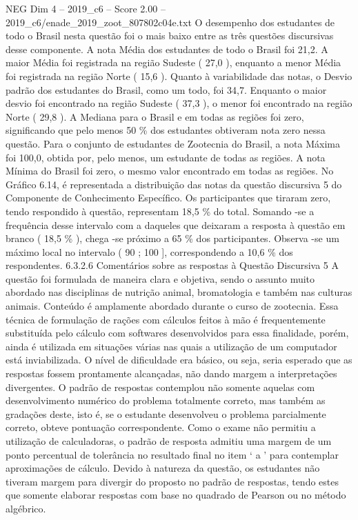 \begin{textsample}{NEG Dim 4 – 2019\_c6 – Score 2.00 – 2019\_c6/enade\_2019\_zoot\_807802c04e.txt}
O desempenho dos estudantes de todo o Brasil nesta questão foi o mais baixo entre as três questões discursivas desse componente.
A nota Média dos estudantes de todo o Brasil foi 21,2.
A maior Média foi registrada na região Sudeste ( 27,0 ), enquanto a menor Média foi registrada na região Norte ( 15,6 ).
Quanto à variabilidade das notas, o Desvio padrão dos estudantes do Brasil, como um todo, foi 34,7.
Enquanto o maior desvio foi encontrado na região Sudeste ( 37,3 ), o menor foi encontrado na região Norte ( 29,8 ).
A Mediana para o Brasil e em todas as regiões foi zero, significando que pelo menos 50 \% dos estudantes obtiveram nota zero nessa questão.
Para o conjunto de estudantes de Zootecnia do Brasil, a nota Máxima foi 100,0, obtida por, pelo menos, um estudante de todas as regiões.
A nota Mínima do Brasil foi zero, o mesmo valor encontrado em todas as regiões.
No Gráfico 6.14, é representada a distribuição das notas da questão discursiva 5 do Componente de Conhecimento Específico.
Os participantes que tiraram zero, tendo respondido à questão, representam 18,5 \% do total.
Somando -se a frequência desse intervalo com a daqueles que deixaram a resposta à questão em branco ( 18,5 \% ), chega -se próximo a 65 \% dos participantes.
Observa -se um máximo local no intervalo ( 90 ; 100 ], correspondendo a 10,6 \% dos respondentes. 6.3.2.6 Comentários sobre as respostas à Questão Discursiva 5 A questão foi formulada de maneira clara e objetiva, sendo o assunto muito abordado nas disciplinas de nutrição animal, bromatologia e também nas culturas animais.
Conteúdo é amplamente abordado durante o curso de zootecnia.
Essa técnica de formulação de rações com cálculos feitos à mão é frequentemente substituída pelo cálculo com softwares desenvolvidos para essa finalidade, porém, ainda é utilizada em situações várias nas quais a utilização de um computador está inviabilizada.
O nível de dificuldade era básico, ou seja, seria esperado que as respostas fossem prontamente alcançadas, não dando margem a interpretações divergentes.
O padrão de respostas contemplou não somente aquelas com desenvolvimento numérico do problema totalmente correto, mas também as gradações deste, isto é, se o estudante desenvolveu o problema parcialmente correto, obteve pontuação correspondente.
Como o exame não permitiu a utilização de calculadoras, o padrão de resposta admitiu uma margem de um ponto percentual de tolerância no resultado final no item ‘ a ’ para contemplar aproximações de cálculo.
Devido à natureza da questão, os estudantes não tiveram margem para divergir do proposto no padrão de respostas, tendo estes que somente elaborar respostas com base no quadrado de Pearson ou no método algébrico.

\end{textsample}
